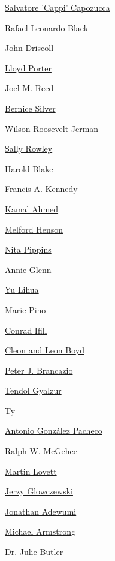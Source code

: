\protect\hyperlink{salvatore-cappi-capozucca}{Salvatore 'Cappi'
Capozucca}

\protect\hyperlink{rafael-leonardo-black}{Rafael Leonardo Black}

\protect\hyperlink{john-driscoll}{John Driscoll}

\protect\hyperlink{lloyd-porter}{Lloyd Porter}

\protect\hyperlink{joel-m-reed}{Joel M. Reed}

\protect\hyperlink{bernice-silver}{Bernice Silver}

\protect\hyperlink{wilson-roosevelt-jerman}{Wilson Roosevelt Jerman}

\protect\hyperlink{sally-rowley}{Sally Rowley}

\protect\hyperlink{harold-blake}{Harold Blake}

\protect\hyperlink{francis-a-kennedy}{Francis A. Kennedy}

\protect\hyperlink{kamal-ahmed}{Kamal Ahmed}

\protect\hyperlink{melford-henson}{Melford Henson}

\protect\hyperlink{nita-pippins}{Nita Pippins}

\protect\hyperlink{annie-glenn}{Annie Glenn}

\protect\hyperlink{yu-lihua}{Yu Lihua}

\protect\hyperlink{marie-pino}{Marie Pino}

\protect\hyperlink{conrad-ifill}{Conrad Ifill}

\protect\hyperlink{cleon-and-leon-boyd}{Cleon and Leon Boyd}

\protect\hyperlink{peter-j-brancazio}{Peter J. Brancazio}

\protect\hyperlink{tendol-gyalzur}{Tendol Gyalzur}

\protect\hyperlink{ty}{Ty}

\protect\hyperlink{antonio-gonzuxe1lez-pacheco}{Antonio González
Pacheco}

\protect\hyperlink{ralph-w-mcgehee}{Ralph W. McGehee}

\protect\hyperlink{martin-lovett}{Martin Lovett}

\protect\hyperlink{jerzy-glowczewski}{Jerzy Glowczewski}

\protect\hyperlink{jonathan-adewumi-}{Jonathan Adewumi}

\protect\hyperlink{michael-armstrong}{Michael Armstrong}

\protect\hyperlink{dr-julie-butler}{Dr. Julie Butler}

